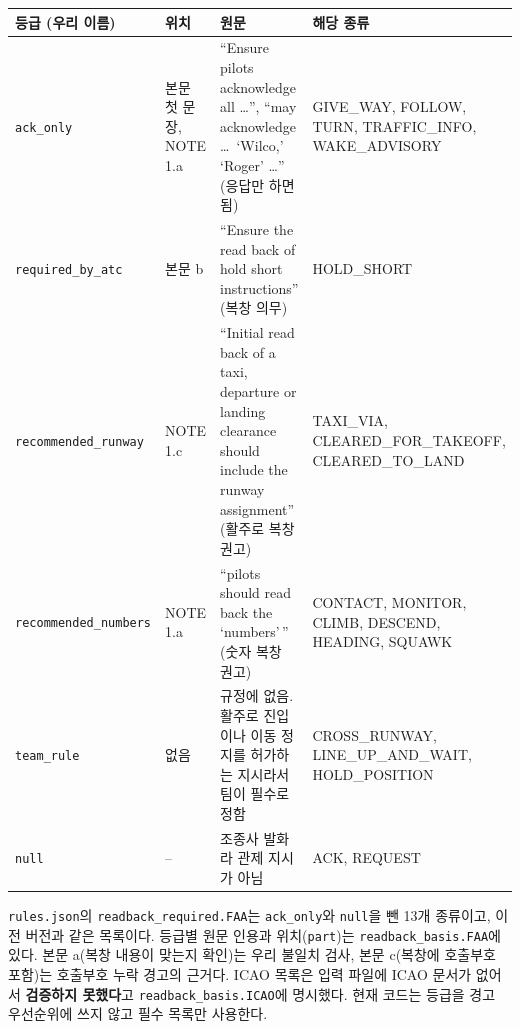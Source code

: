 \documentclass[10pt,a4paper]{article}
\newcommand{\cmd}[1]{\textsf{\small #1}}
\newcommand{\key}[1]{\texttt{\small #1}}
\begin{document}
\begin{center}\small
\begin{tabularx}{\textwidth}{@{}l l>{\raggedright\arraybackslash}X>{\raggedright\arraybackslash}p{4.0cm}@{}}
\toprule
등급 (우리 이름) & 위치 & 원문 & 해당 종류\\\midrule
\key{ack\_only} & 본문 첫 문장, NOTE 1.a & ``Ensure pilots acknowledge all \ldots'', ``may acknowledge \ldots\ `Wilco,' `Roger' \ldots'' (응답만 하면 됨) & \cmd{GIVE\_WAY}, \cmd{FOLLOW}, \cmd{TURN}, \cmd{TRAFFIC\_INFO}, \cmd{WAKE\_ADVISORY}\\
\key{required\_by\_atc} & 본문 b & ``Ensure the read back of hold short instructions'' (복창 의무) & \cmd{HOLD\_SHORT}\\
\key{recommended\_runway} & NOTE 1.c & ``Initial read back of a taxi, departure or landing clearance should include the runway assignment'' (활주로 복창 권고) & \cmd{TAXI\_VIA}, \cmd{CLEARED\_FOR\_TAKEOFF}, \cmd{CLEARED\_TO\_LAND}\\
\key{recommended\_numbers} & NOTE 1.a & ``pilots should read back the `numbers'\,'' (숫자 복창 권고) & \cmd{CONTACT}, \cmd{MONITOR}, \cmd{CLIMB}, \cmd{DESCEND}, \cmd{HEADING}, \cmd{SQUAWK}\\
\key{team\_rule} & 없음 & 규정에 없음. 활주로 진입이나 이동 정지를 허가하는 지시라서 팀이 필수로 정함 & \cmd{CROSS\_RUNWAY}, \cmd{LINE\_UP\_AND\_WAIT}, \cmd{HOLD\_POSITION}\\
\texttt{null} & -- & 조종사 발화라 관제 지시가 아님 & \cmd{ACK}, \cmd{REQUEST}\\
\bottomrule
\end{tabularx}
\end{center}
\noindent \texttt{rules.json}의 \key{readback\_required.FAA}는 \key{ack\_only}와 \texttt{null}을 뺀 13개 종류이고, 이전 버전과 같은 목록이다. 등급별 원문 인용과 위치(\key{part})는 \key{readback\_basis.FAA}에 있다. 본문 a(복창 내용이 맞는지 확인)는 우리 불일치 검사, 본문 c(복창에 호출부호 포함)는 호출부호 누락 경고의 근거다. ICAO 목록은 입력 파일에 ICAO 문서가 없어서 \textbf{검증하지 못했다}고 \key{readback\_basis.ICAO}에 명시했다. 현재 코드는 등급을 경고 우선순위에 쓰지 않고 필수 목록만 사용한다.

\end{document}
